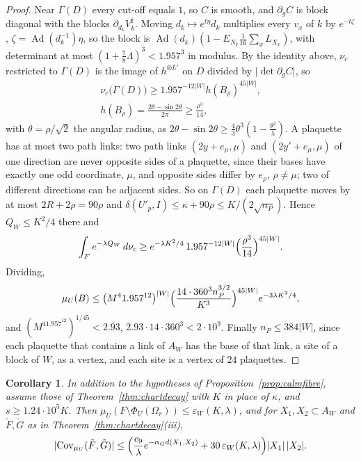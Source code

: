 \documentclass[11pt]{amsart}
\newtheorem{corollary}[theorem]{Corollary}
\theoremstyle{definition}
\theoremstyle{remark}
\numberwithin{equation}{section}
\newcommand{\Cov}{\operatorname{Cov}}
\begin{document}
\begin{proof}
Near $\Gamma(D)$ every cut-off equals $1$, so $C$ is smooth, and $\partial_g
C$ is block diagonal with the blocks $\partial_{d_k}V^\sharp_k$. Moving
$d_k\mapsto e^{t\eta}d_k$ multiplies every $v_x$ of $k$ by $e^{-t\zeta}$,
$\zeta=\operatorname{Ad}(d_k^{-1})\eta$, so the block is $\operatorname{Ad}
(d_k)(1-E_{N_k}\frac1{16}\sum_xL_{X_x})$, with determinant at most $(1+\frac
78\Lambda)^3<1.957^3$ in modulus. By the identity above, $\nu_c$ restricted
to $\Gamma(D)$ is the image of $h^{\otimes L'}$ on $D$ divided by $\lvert\det
\partial_gC\rvert$, so
\begin{gather*}
\nu_c\bigl(\Gamma(D)\bigr)\ge1.957^{-12|W|}h(B_\rho)^{45|W|},\\
h(B_\rho)=\frac{2\theta-\sin2\theta}{2\pi}\ge\frac{\rho^3}{14},
\end{gather*}
with $\theta=\rho/\sqrt2$ the angular radius, as $2\theta-\sin2\theta\ge
\frac43\theta^3(1-\frac{\theta^2}5)$. A plaquette has at most two path links: two path links $(2y+e_\mu,\mu)$
and $(2y'+e_\mu,\mu)$ of one direction are never opposite sides of a
plaquette, since their bases have exactly one odd coordinate, $\mu$, and
opposite sides differ by $e_\rho$, $\rho\ne\mu$; two of different
directions can be adjacent sides. So on $\Gamma(D)$ each plaquette moves
by at most $2R+2\rho=90\rho$ and $\delta(U'_p,I)\le\kappa+90\rho\le K/(2\sqrt{n_P})$.
Hence $Q_W\le K^2/4$ there and
\[
\int_Fe^{-\lambda Q_W}\,d\nu_c\ge e^{-\lambda K^2/4}\,1.957^{-12|W|}
\Bigl(\frac{\rho^3}{14}\Bigr)^{45|W|}.
\]
Dividing,
\[
\mu_U(B)\le\bigl(M^41.957^{12}\bigr)^{|W|}\Bigl(\frac{14\cdot360^3n_P^{3/2}}
{K^3}\Bigr)^{45|W|}e^{-3\lambda K^2/4},
\]
and $(M^41.957^{12})^{1/45}<2.93$, $2.93\cdot14\cdot360^3<2\cdot10^9$. Finally $n_P\le384|W|$, since each plaquette
that contains a link of $A_W$ has the base of that link, a site of a block of
$W$, as a vertex, and each site is a vertex of $24$ plaquettes.
\end{proof}

\begin{corollary}\label{cor:calmfibres}
In addition to the hypotheses of Proposition~\ref{prop:calmfibre}, assume
those of Theorem~\ref{thm:chartdecay} with $K$ in place of $\kappa$, and
$s\ge1.24\cdot10^5K$. Then $\mu_U(F\setminus\Phi_U(\Omega_r))\le
\varepsilon_W(K,\lambda)$, and for $X_1,X_2\subset A_W$ and $\tilde F,\tilde G$
as in Theorem~\ref{thm:chartdecay}\textup{(iii)},
\[
\lvert\Cov_{\mu_U}(\tilde F,\tilde G)\rvert\le\Bigl(\frac{c_9}\lambda e^{-
\alpha_Gd(X_1,X_2)}+30\,\varepsilon_W(K,\lambda)\Bigr)\lvert X_1\rvert\,
\lvert X_2\rvert .
\]
\end{corollary}
\end{document}
